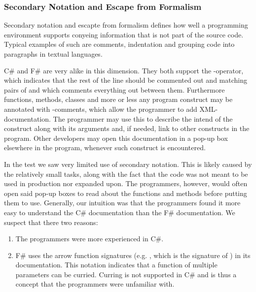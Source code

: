 \subsubsection{Secondary Notation and Escape from Formalism}
Secondary notation and escapte from formalism defines how well a programming environment supports conyeing information that is not part of the source code. Typical examples of such are comments, indentation and grouping code into paragraphs in textual languages\cite{green1996usability}.

C\# and F\# are very alike in this dimension. They both support the \ttt{//}-operator, which indicates that the rest of the line should be commented out and matching pairs of \ttt{/*} and \ttt{*/} which comments everything out between them. Furthermore functions, methods, classes and more or less any program construct may be annotated with \ttt{///}-comments, which allow the programmer to add \gls{XML}-documentation\cite{fsharp:xml:doc}. The programmer may use this to describe the intend of the construct along with its arguments and, if needed, link to other constructs in the program. Other developers may open this documentation in a pop-up box elsewhere in the program, whenever such construct is encountered.

In the test we saw very limited use of secondary notation. This is likely caused by the relatively small tasks, along with the fact that the code was not meant to be used in production nor expanded upon. The programmers, however, would often open said pop-up boxes to read about the functions and methods before putting them to use. Generally, our intuition was that the programmers found it more easy to understand the C\# documentation than the F\# documentation. We suspect that there two reasons:
\begin{enumerate}
    \item The programmers were more experienced in C\#.
    \item F\# uses the arrow function signatures (e.g. , which is the signature of ) in its documentation. This notation indicates that a function of multiple parameters can be curried. Curring is not supported in C\# and is thus a concept that the programmers were unfamiliar with.
\end{enumerate}